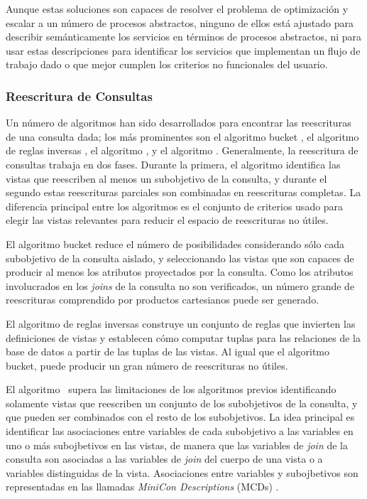 Aunque estas soluciones son capaces de resolver el problema de optimización y
escalar a un número de procesos abstractos, ninguno de ellos está ajustado para
describir semánticamente los servicios en términos de procesos abstractos, ni
para usar estas descripciones para identificar los servicios que implementan un
flujo de trabajo dado o que mejor cumplen los criterios no funcionales del
usuario.

\subsubsection{Reescritura de Consultas}

Un número de algoritmos han sido desarrollados para encontrar las reescrituras
de una consulta dada; los más prominentes son el algoritmo bucket \cite{levy:bucket}, el
algoritmo de reglas inversas \cite{pods:DuschkaG97,Qian96}, el algoritmo
\minicon \cite{pottinger:minicon}, y el
algoritmo \mcdsat \cite{arvelo:aaai06}. Generalmente, la reescritura de consultas trabaja en
dos fases. Durante la primera, el algoritmo identifica las vistas que reescriben
al menos un subobjetivo de la consulta, y durante el segundo estas reescrituras
parciales son combinadas en reescrituras completas. La diferencia principal
entre los algoritmos es el conjunto de criterios usado para elegir las vistas
relevantes para reducir el espacio de reescrituras no útiles.

El algoritmo bucket reduce el número de posibilidades considerando sólo cada
subobjetivo de la consulta aislado, y seleccionando las vistas que son capaces
de producir al menos los atributos proyectados por la consulta. Como los
atributos involucrados en los \emph{joins} de la consulta no son verificados, un número
grande de reescrituras comprendido por productos cartesianos puede ser generado.

El algoritmo de reglas inversas construye un conjunto de reglas que invierten
las definiciones de vistas y establecen cómo computar tuplas para las relaciones
de la base de datos a partir de las tuplas de las vistas. Al igual que el algoritmo
bucket, puede producir un gran número de reescrituras no útiles.

El algoritmo \minicon\ supera las limitaciones de los algoritmos previos
identificando solamente vistas que reescriben un conjunto de los subobjetivos de
la consulta, y que pueden ser combinados con el resto de los subobjetivos. La
idea principal es identificar las asociaciones entre variables de cada
subobjetivo a las variables en uno o más subojbetivos en las vistas, de manera
que las variables de \emph{join} de la consulta son asociadas a las variables de
\emph{join}
del cuerpo de una vista o a variables distinguidas de la vista. Asociaciones
entre variables y subojbetivos son representadas en las llamadas \emph{MiniCon
Descriptions} (MCDs) \cite{pottinger:minicon}.

